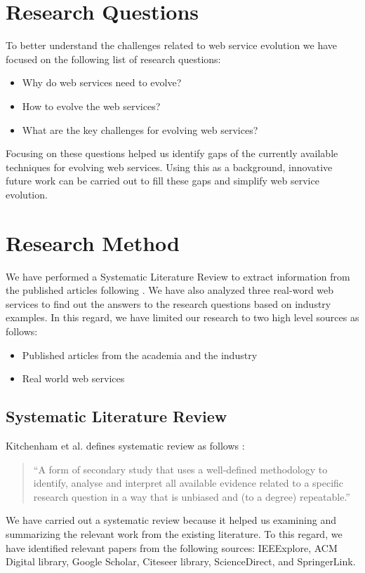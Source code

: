 \documentclass[runningheads,a4paper]{llncs}
\begin{document}

\section{Research Questions} %
\label{sec:research_questions}
To better understand the challenges related to web service evolution we have focused on the following list of research questions:

\begin{itemize}
  \item Why do web services need to evolve?
  \item How to evolve the web services?
  \item What are the key challenges for evolving web services?
\end{itemize}

Focusing on these questions helped us identify gaps of the currently available techniques for evolving web services. Using this as a background, innovative future work can be carried out to fill these gaps and simplify web service evolution.

\section{Research Method} %
\label{sec:research_method}

We have performed a Systematic Literature Review to extract information from the published articles following \cite{kitchenham2007guidelines}. We have also analyzed three real-word web services to find out the answers to the research questions based on industry examples.
In this regard, we have limited our research to two high level sources as follows:

\begin{itemize}
  \item Published articles from the academia and the industry
  \item Real world web services
\end{itemize}

\subsection{Systematic Literature Review} %
\label{sub:systematic_literature_review}
Kitchenham et al. defines systematic review as follows \cite{kitchenham2007guidelines}:

\begin{quote}
``A form of secondary study that uses a well-defined methodology to identify, analyse and interpret all available evidence related to a specific research question in a way that is unbiased and (to a degree) repeatable.''
\end{quote}
We have carried out a systematic review because it helped us examining and summarizing the relevant work from the existing literature. To this regard, we have identified relevant papers from the following sources: IEEExplore, ACM Digital library, Google Scholar, Citeseer library, ScienceDirect, and SpringerLink.
\end{document}
